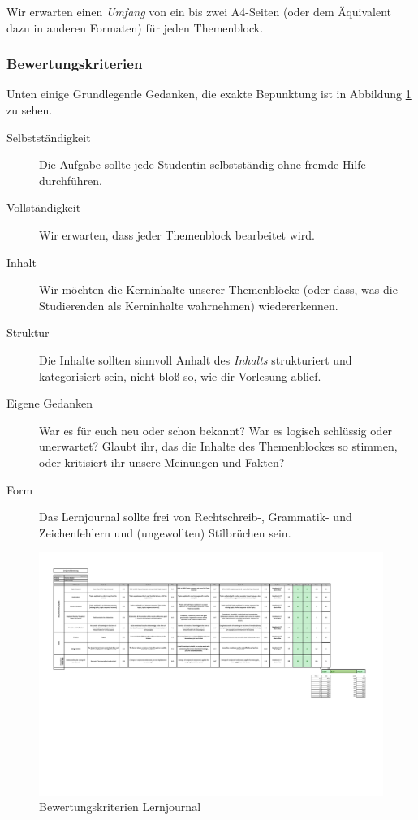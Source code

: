 \documentclass[DIV=15,headinclude]{scrartcl}
\begin{document}
Wir erwarten einen \emph{Umfang} von ein bis zwei A4-Seiten (oder dem Äquivalent dazu in anderen Formaten) für jeden Themenblock.

\subsubsection{Bewertungskriterien}

Unten einige Grundlegende Gedanken, die exakte Bepunktung ist in Abbildung \ref{abb:lernjournal} zu sehen.

\begin{description}
	\item[Selbstständigkeit] Die Aufgabe sollte jede Studentin selbstständig ohne fremde Hilfe durchführen.
	\item[Vollständigkeit] Wir erwarten, dass jeder Themenblock bearbeitet wird.
	\item[Inhalt] Wir möchten die Kerninhalte unserer Themenblöcke (oder dass, was die Studierenden als Kerninhalte wahrnehmen) wiedererkennen.
	\item[Struktur] Die Inhalte sollten sinnvoll Anhalt des \emph{Inhalts} strukturiert und kategorisiert sein, nicht bloß so, wie dir Vorlesung ablief.
	\item[Eigene Gedanken] War es für euch neu oder schon bekannt? War es logisch schlüssig oder unerwartet? Glaubt ihr, das die Inhalte des Themenblockes so stimmen, oder kritisiert ihr unsere Meinungen und Fakten?
	\item[Form] Das Lernjournal sollte frei von Rechtschreib-, Grammatik- und Zeichenfehlern und (ungewollten) Stilbrüchen sein.
\end{description}


\begin{landscape}
\begin{figure}
  \includegraphics[width=\linewidth]{lernjournal}
  \caption{Bewertungskriterien Lernjournal}
  \label{abb:lernjournal}
\end{figure}
\end{landscape}
\end{document}
